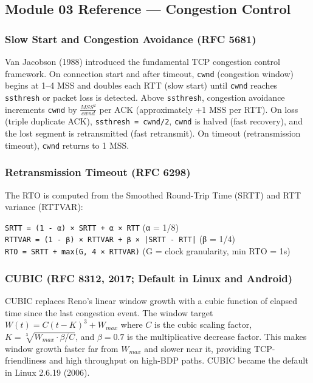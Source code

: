 \documentclass[11pt,letterpaper]{article}
\begin{document}
\subsection{Module 03 Reference --- Congestion Control}

\subsubsection{Slow Start and Congestion Avoidance (RFC 5681)}

Van Jacobson (1988) introduced the fundamental TCP congestion control framework. On connection start and after timeout, \texttt{cwnd} (congestion window) begins at 1--4 MSS and doubles each RTT (slow start) until \texttt{cwnd} reaches \texttt{ssthresh} or packet loss is detected. Above \texttt{ssthresh}, congestion avoidance increments \texttt{cwnd} by $\frac{MSS^2}{cwnd}$ per ACK (approximately +1 MSS per RTT). On loss (triple duplicate ACK), \texttt{ssthresh = cwnd/2}, \texttt{cwnd} is halved (fast recovery), and the lost segment is retransmitted (fast retransmit). On timeout (retransmission timeout), \texttt{cwnd} returns to 1 MSS.

\subsubsection{Retransmission Timeout (RFC 6298)}

The RTO is computed from the Smoothed Round-Trip Time (SRTT) and RTT variance (RTTVAR):

\begin{center}
\texttt{SRTT = (1 - α) × SRTT + α × RTT} \quad (α = 1/8)\\[0.3em]
\texttt{RTTVAR = (1 - β) × RTTVAR + β × |SRTT - RTT|} \quad (β = 1/4)\\[0.3em]
\texttt{RTO = SRTT + max(G, 4 × RTTVAR)} \quad (G = clock granularity, min RTO = 1s)
\end{center}

\subsubsection{CUBIC (RFC 8312, 2017; Default in Linux and Android)}

CUBIC replaces Reno's linear window growth with a cubic function of elapsed time since the last congestion event. The window target $W(t) = C(t - K)^3 + W_{max}$ where $C$ is the cubic scaling factor, $K = \sqrt[3]{W_{max} \cdot \beta / C}$, and $\beta = 0.7$ is the multiplicative decrease factor. This makes window growth faster far from $W_{max}$ and slower near it, providing TCP-friendliness and high throughput on high-BDP paths. CUBIC became the default in Linux 2.6.19 (2006).
\end{document}
